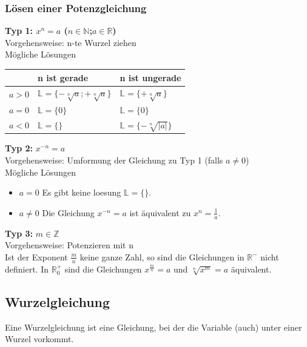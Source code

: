 \begin{multicols}{2}
    \subsubsection{Lösen einer Potenzgleichung}
    \vspace{-4mm}
    \textbf{Typ 1:  $x^n = a$ ($n \in \mathbb{N}$;$a \in \mathbb{R}$)} \\
    Vorgehensweise: n-te Wurzel ziehen\\
    Mögliche Lösungen \\
    \begin{tabularx}{0.5\textwidth} {
            | >{\raggedright\arraybackslash}c
            | >{\raggedright\arraybackslash}X
            | >{\raggedright\arraybackslash}X |}
        \hline
        \textbf{} & \textbf{n ist gerade}                        & \textbf{n ist ungerade}           \\ \hline
        $a > 0$   & $\mathbb{L} = \{-\sqrt[n]{a};+\sqrt[n]{a}\}$ & $\mathbb{L} = \{+\sqrt[n]{a}\}$   \\ \hline
        $a = 0$   & $\mathbb{L} = \{0\}$                         & $\mathbb{L} = \{0\}$              \\ \hline
        $a < 0$   & $\mathbb{L} = \{\}$                          & $\mathbb{L} = \{-\sqrt[n]{|a|}\}$ \\ \hline
    \end{tabularx}

    \textbf{Typ 2:} $x^{-n} = a$\\
    Vorgehensweise: Umformung der Gleichung zu Typ 1 (falls $a \neq 0$)\\
    Mögliche Lösungen
    \begin{itemize}
        \item  $a = 0$ Es gibt keine loesung $\mathbb{L} = \{\}$.
        \item  $a \neq 0$ Die Gleichung $x^{-n} = a$ ist äquivalent zu $x^n = \frac{1}{a}$.
    \end{itemize}
    \textbf{Typ 3:} $m \in \mathbb{Z}$ \\
    Vorgehensweise: Potenzieren mit n\\
    Ist der Exponent $\frac{m}{n}$ keine ganze Zahl, so sind die Gleichungen in $\mathbb{R}^{-}$ nicht definiert. In $\mathbb{R}_{0}^{+}$ sind die Gleichungen $x^{\frac{m}{n}} = a$ und $\sqrt[n]{x^m} = a$ äquivalent.\\

    \subsection{Wurzelgleichung}
    \vspace{-4mm}
    Eine Wurzelgleichung ist eine Gleichung, bei der die Variable (auch) unter einer Wurzel vorkommt.

\end{multicols}
